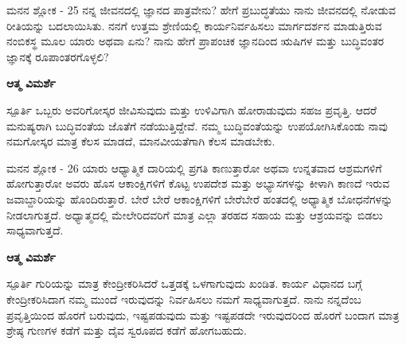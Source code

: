 \newpage
\begin{mananam}{\mananamfont ಮನನ ಶ್ಲೋಕ - \textenglish{25}}
\footnotesize \mananamtext ನನ್ನ ಜೀವನದಲ್ಲಿ ಜ್ಞಾನದ ಪಾತ್ರವೇನು? ಹೇಗೆ ಪ್ರಬುದ್ಧತೆಯು ನಾನು ಜೀವನದಲ್ಲಿ ನೋಡುವ ರೀತಿಯನ್ನು ಬದಲಾಯಿಸಿತು. ನನಗೆ ಉತ್ತಮ ಶ್ರೇಣಿಯಲ್ಲಿ ಕಾರ್ಯನಿರ್ವಹಿಸಲು ಮಾರ್ಗದರ್ಶನ ಮಾಡುತ್ತಿರುವ ನಂಬಿಕಸ್ಥ ಮೂಲ ಯಾರು ಅಥವಾ ಏನು? ನಾನು ಹೇಗೆ ಪ್ರಾಪಂಚಿಕ ಜ್ಞಾನದಿಂದ ಋಷಿಗಳ ಮತ್ತು ಬುದ್ಧಿವಂತರ ಜ್ಞಾನಕ್ಕೆ ರೂಪಾಂತರಗೊಳ್ಳಲಿ?
\end{mananam}
\WritingHand\enspace\textbf{ಆತ್ಮ ವಿಮರ್ಶೆ}\\
\begin{inspiration}{\mananamfont ಸ್ಪೂರ್ತಿ}
\footnotesize \mananamtext ಒಬ್ಬರು ಅವರಿಗೋಸ್ಕರ ಜೀವಿಸುವುದು ಮತ್ತು ಉಳಿವಿಗಾಗಿ ಹೋರಾಡುವುದು ಸಹಜ ಪ್ರವೃತ್ತಿ. ಆದರೆ ಮನುಷ್ಯರಾಗಿ ಬುದ್ಧಿವಂತೆಯ ಜೊತೆಗೆ ನಡೆಯುತ್ತಿದ್ದೇವೆ. ನಮ್ಮ ಬುದ್ಧಿವಂತೆಯನ್ನು ಉಪಯೋಗಿಸಿಕೊಂಡು ನಾವು ನಮಗೋಸ್ಕರ ಮಾತ್ರ ಕೆಲಸ ಮಾಡದೆ, ಮಾನವೀಯತೆಗಾಗಿ ಕೆಲಸ ಮಾಡಬೇಕು.
\end{inspiration}
\newpage


\newpage
\begin{mananam}{\mananamfont ಮನನ ಶ್ಲೋಕ - \textenglish{26}}
\footnotesize \mananamtext ಯಾರು ಆಧ್ಯಾತ್ಮಿಕ ದಾರಿಯಲ್ಲಿ ಪ್ರಗತಿ ಕಾಣುತ್ತಾರೋ ಅಥವಾ ಉನ್ನತವಾದ ಆಶ್ರಮಗಳಿಗೆ ಹೋಗುತ್ತಾರೋ ಅವರು ಹೊಸ ಆಕಾಂಕ್ಷಿಗಳಿಗೆ ಕೊಟ್ಟ ಉಪದೇಶ ಮತ್ತು ಅಭ್ಯಾಸಗಳನ್ನು ಕೀಳಾಗಿ ಕಾಣದೆ ಇರುವ ಜವಾಬ್ದಾರಿಯನ್ನು ಹೊಂದಿರುತ್ತಾರೆ. ಬೇರೆ ಬೇರೆ ಆಕಾಂಕ್ಷಿಗಳಿಗೆ ಬೇರೆಬೇರೆ ಹಂತದಲ್ಲಿ ಅಧ್ಯಾತ್ಮಿಕ ಬೋಧನೆಗಳನ್ನು ನೀಡಲಾಗುತ್ತದೆ. ಅಧ್ಯಾತ್ಮದಲ್ಲಿ ಮೇಲೇರಿದವರಿಗೆ ಮಾತ್ರ ಎಲ್ಲಾ ತರಹದ ಸಹಾಯ ಮತ್ತು ಆಶ್ರಯವನ್ನು ಬಿಡಲು ಸಾಧ್ಯವಾಗುತ್ತದೆ.
\end{mananam}
\WritingHand\enspace\textbf{ಆತ್ಮ ವಿಮರ್ಶೆ}\\
\begin{inspiration}{\mananamfont ಸ್ಪೂರ್ತಿ}
\footnotesize \mananamtext ಗುರಿಯನ್ನು ಮಾತ್ರ ಕೇಂದ್ರೀಕರಿಸಿದರೆ ಒತ್ತಡಕ್ಕೆ ಒಳಗಾಗುವುದು ಖಂಡಿತ. ಕಾರ್ಯ ವಿಧಾನದ ಬಗ್ಗೆ ಕೇಂದ್ರೀಕರಿಸಿದಾಗ ನಮ್ಮ ಮುಂದೆ ಇರುವುದನ್ನು ನಿರ್ವಹಿಸಲು ನಮಗೆ ಸಾಧ್ಯವಾಗುತ್ತದೆ. ನಾನು ನನ್ನದೆಂಬ ಪ್ರವೃತ್ತಿಯಿಂದ ಹೊರಗೆ ಬರುವುದು, ಇಷ್ಟಪಡುವುದು ಮತ್ತು ಇಷ್ಟಪಡದೇ ಇರುವುದರಿಂದ ಹೊರಗೆ ಬಂದಾಗ ಮಾತ್ರ ಶ್ರೇಷ್ಠ ಗುಣಗಳ ಕಡೆಗೆ ಮತ್ತು ದೈವ ಸ್ವರೂಪದ ಕಡೆಗೆ ಹೋಗಬಹುದು.
\end{inspiration}
\newpage


